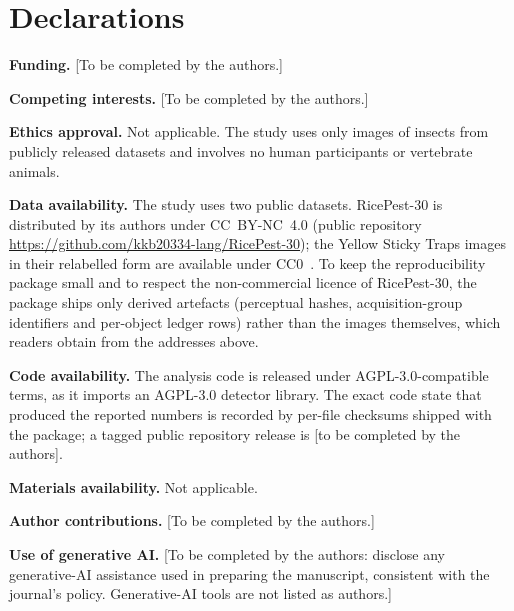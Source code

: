 \section*{Declarations}

\noindent\textbf{Funding.} [To be completed by the authors.]

\medskip\noindent\textbf{Competing interests.} [To be completed by the authors.]

\medskip\noindent\textbf{Ethics approval.} Not applicable. The study uses only images of insects from publicly released datasets and involves no human participants or vertebrate animals.

\medskip\noindent\textbf{Data availability.} The study uses two public datasets. RicePest-30 is distributed by its authors under CC~BY-NC~4.0 (public repository \url{https://github.com/kkb20334-lang/RicePest-30}); the Yellow Sticky Traps images in their relabelled form are available under CC0~\citep{deserno2021relabeled}. To keep the reproducibility package small and to respect the non-commercial licence of RicePest-30, the package ships only derived artefacts (perceptual hashes, acquisition-group identifiers and per-object ledger rows) rather than the images themselves, which readers obtain from the addresses above.

\medskip\noindent\textbf{Code availability.} The analysis code is released under AGPL-3.0-compatible terms, as it imports an AGPL-3.0 detector library. The exact code state that produced the reported numbers is recorded by per-file checksums shipped with the package; a tagged public repository release is [to be completed by the authors].

\medskip\noindent\textbf{Materials availability.} Not applicable.

\medskip\noindent\textbf{Author contributions.} [To be completed by the authors.]

\medskip\noindent\textbf{Use of generative AI.} [To be completed by the authors: disclose any generative-AI assistance used in preparing the manuscript, consistent with the journal's policy. Generative-AI tools are not listed as authors.]
